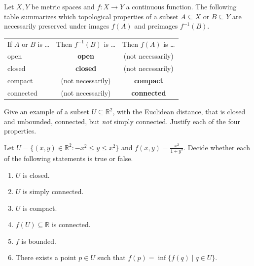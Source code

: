 \begin{remark}
\label{rem:summary_continuous_maps}
Let $X,Y$ be metric spaces and $f: X \to Y$ a continuous function. The following table summarizes which topological properties of a subset $A \subseteq X$ or $B \subseteq Y$ are necessarily preserved under images $f(A)$ and preimages $f^{-1}(B)$.

\begin{center}
\begin{tabular}{@{}l c c@{}}
If $A$ or $B$ is \dots & Then $f^{-1}(B)$ is \dots & Then $f(A)$ is \dots \\
open & \textbf{open} & (not necessarily) \\
closed & \textbf{closed} & (not necessarily) \\
compact & (not necessarily) & \textbf{compact} \\
connected & (not necessarily) & \textbf{connected}
\end{tabular}
\end{center}
\end{remark}

\begin{exercise}
\label{ex:closed_unbounded_not_simply_connected}
Give an example of a subset $U \subseteq \mathbb{R}^2$, with the Euclidean distance, that is closed
and unbounded, connected, but \emph{not} simply connected. Justify each of the four properties.
\end{exercise}

\begin{exercise}
\label{ex:examHS24_TF_topology}
Let $U = \{ (x,y) \in \mathbb{R}^2 : -x^2 \le y \le x^2 \}$ and $f(x,y) = \frac{x^2}{1+y^2}$.
Decide whether each of the following statements is true or false.
\begin{enumerate}[label=\textbf{(\alph*)}]
  \item $U$ is closed.
  \item $U$ is simply connected.
  \item $U$ is compact.
  \item $f(U) \subseteq \mathbb{R}$ is connected.
  \item $f$ is bounded.
  \item There exists a point $p \in U$ such that $f(p) = \inf\{f(q) \mid q \in U\}$.
\end{enumerate}
\end{exercise}

